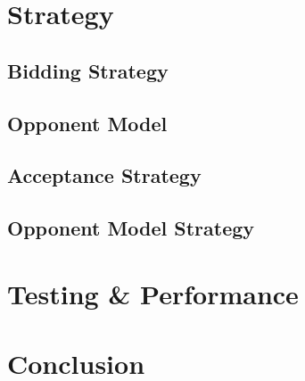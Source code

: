 \documentclass[a4paper,10pt]{article}
\begin{document}
\section{Strategy}
\label{sec:strategy}

\subsection{Bidding Strategy}
\label{sec:strategyBS}


\subsection{Opponent Model}
\label{sec:strategyOM}


\subsection{Acceptance Strategy}
\label{sec:strategyAS}


\subsection{Opponent Model Strategy} 
\label{sec:strategyOMS}


\section{Testing \& Performance}
\label{sec:performance}



\section{Conclusion}
\label{sec:conclusion}




\end{document}
